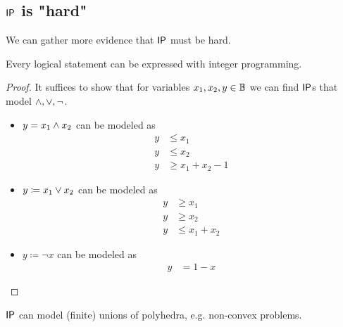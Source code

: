 \subsection{$\mathsf{IP}$ is "hard"}
We can gather more evidence that $\mathsf{IP}$ must be hard.
\begin{theorem}
    \label{thm:ip-logical-decomposition}
    Every logical statement can be expressed with integer programming.
\end{theorem}
\begin{proof}
    It suffices to show that for variables $x_1,x_2,y \in \mathbb{B}$ we can find $\mathsf{IP}$s that model $\wedge, \vee, \neg$.
    \begin{itemize}
        \item $y = x_1 \wedge x_2$ can be modeled as
              \begin{align*}
                  y & \leq x_1           \\
                  y & \leq x_2           \\
                  y & \geq x_1 + x_2 - 1
              \end{align*}
        \item $y \coloneqq x_1 \vee x_2$ can be modeled as
              \begin{align*}
                  y & \geq x_1       \\
                  y & \geq x_2       \\
                  y & \leq x_1 + x_2
              \end{align*}
        \item $y \coloneqq \neg x$ can be modeled as
              \begin{align*}
                  y & = 1- x
              \end{align*}
    \end{itemize}
\end{proof}
\begin{theorem}
    \label{thm:ip-model-union}
    $\mathsf{IP}$ can model (finite) unions of polyhedra, e.g. non-convex problems.
\end{theorem}
